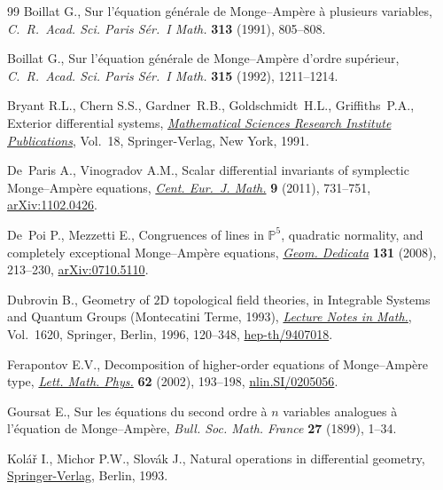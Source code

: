 \documentclass[pdftex]{sigma}
\numberwithin{equation}{section}
\begin{document}
\begin{thebibliography}{99}
Boillat G., Sur l'\'equation g\'en\'erale de {M}onge--{A}mp\`ere \`a plusieurs
 variables, \textit{C.~R.~Acad. Sci. Paris S\'er.~I Math.} \textbf{313}
 (1991), 805--808.

Boillat G., Sur l'\'equation g\'en\'erale de {M}onge--{A}mp\`ere d'ordre
 sup\'erieur, \textit{C.~R.~Acad. Sci. Paris S\'er.~I Math.} \textbf{315}
 (1992), 1211--1214.

Bryant R.L., Chern S.S., Gardner~R.B., Goldschmidt~H.L., Grif\/f\/iths~P.A.,
 Exterior dif\/ferential systems, \href{http://dx.doi.org/10.1007/978-1-4613-9714-4}{\textit{Mathematical Sciences Research
 Institute Publications}}, Vol.~18, Springer-Verlag, New York, 1991.

De~Paris A., Vinogradov A.M., Scalar dif\/ferential invariants of symplectic
 {M}onge--{A}mp\`ere equations, \href{http://dx.doi.org/10.2478/s11533-011-0046-7}{\textit{Cent. Eur.~J. Math.}} \textbf{9}
 (2011), 731--751, \href{http://arxiv.org/abs/1102.0426}{arXiv:1102.0426}.

De~Poi P., Mezzetti E., Congruences of lines in {${\mathbb P}^5$}, quadratic
 normality, and completely exceptional {M}onge--{A}mp\`ere equations,
 \href{http://dx.doi.org/10.1007/s10711-007-9228-7}{\textit{Geom. Dedicata}} \textbf{131} (2008), 213--230, \href{http://arxiv.org/abs/0710.5110}{arXiv:0710.5110}.

Dubrovin B., Geometry of {$2$}{D} topological f\/ield theories, in Integrable
 Systems and Quantum Groups ({M}ontecatini {T}erme, 1993), \href{http://dx.doi.org/10.1007/BFb0094793}{\textit{Lecture
 Notes in Math.}}, Vol.~1620, Springer, Berlin, 1996, 120--348,
 \href{http://arxiv.org/abs/hep-th/9407018}{hep-th/9407018}.

Ferapontov E.V., Decomposition of higher-order equations of {M}onge--{A}mp\`ere
 type, \href{http://dx.doi.org/10.1023/A:1022236709346}{\textit{Lett. Math. Phys.}} \textbf{62} (2002), 193--198,
 \href{http://arxiv.org/abs/nlin.SI/0205056}{nlin.SI/0205056}.

Goursat E., Sur les \'equations du second ordre \`a {$n$} variables analogues
 \`a l'\'equation de {M}onge--{A}mp\`ere, \textit{Bull. Soc. Math. France}
 \textbf{27} (1899), 1--34.

Kol{\'a}{\v{r}} I., Michor P.W., Slov{\'a}k J., Natural operations in
 dif\/ferential geometry, \href{http://dx.doi.org/10.1007/978-3-662-02950-3}{Springer-Verlag}, Berlin, 1993.


\end{thebibliography}
\end{document}
